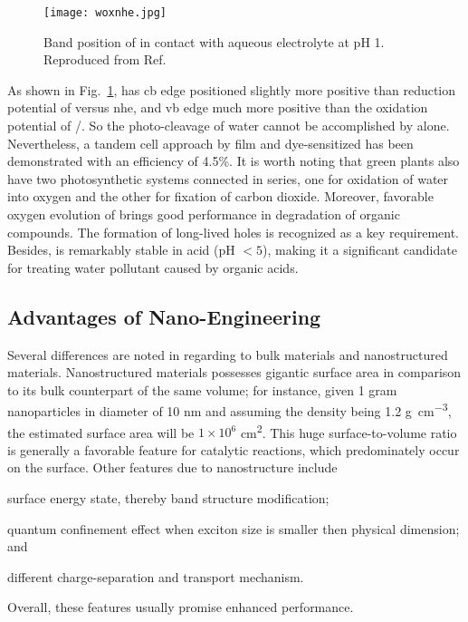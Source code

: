 \begin{figure}[htb]
\centering
\texttt{[image: woxnhe.jpg]}
\caption[Band position of  versus NHE]{Band position of  in contact with aqueous electrolyte at pH 1. Reproduced from Ref.\cite{Gratzel2001}}
\label{fig:woxnhe}
\end{figure}
As shown in Fig.~\ref{fig:woxnhe},  has \gls{cb} edge positioned slightly more positive than reduction potential of  versus \gls{nhe}, and \gls{vb} edge much more positive than the oxidation potential of /. So the photo-cleavage of water cannot be accomplished by  alone. Nevertheless, a tandem cell approach by  film and dye-sensitized  has been demonstrated with an efficiency of 4.5\%.\cite{Michael1999} It is worth noting that green plants also have two photosynthetic systems connected in series, one for oxidation of water into oxygen and the other for fixation of carbon dioxide. Moreover, favorable oxygen evolution of  brings good performance in degradation of organic compounds.\cite{Hepel2001,Luo2001,Watcharenwong2008} The formation of long-lived holes is recognized as a key requirement.\cite{Pesci2011} Besides,  is remarkably stable in acid (pH $<5$), making it a significant candidate for treating water pollutant caused by organic acids.\cite{Monllor-Satoca2006}

\subsection{Advantages of Nano-Engineering}\label{sec:nanoadv}

Several differences are noted in regarding to bulk materials and nanostructured materials. Nanostructured materials possesses gigantic surface area in comparison to its bulk counterpart of the same volume; for instance, given 1 gram  nanoparticles in diameter of 10 nm and assuming the density being 1.2 \si{g\per cm^3}, the estimated surface area will be $1\times10^6$ \si{cm^2}. This huge surface-to-volume ratio is generally a favorable feature for catalytic reactions, which predominately occur on the surface.\cite{Sha2009} Other features due to nanostructure include 
\begin{enumerate*}[label=\itshape\alph*\upshape)]
\item surface energy state, thereby band structure modification;
\item quantum confinement effect when exciton size is smaller then physical dimension; and
\item different charge-separation and transport mechanism.
\end{enumerate*} Overall, these features usually promise enhanced performance. 

